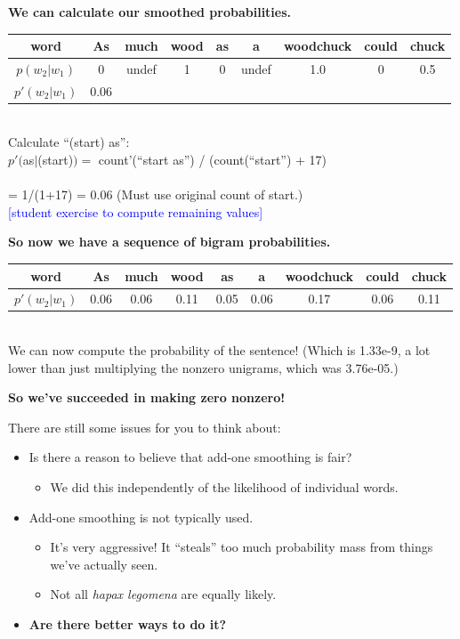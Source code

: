 \documentclass{beamer}
\newcommand{\placard}[1]{
  \begin{frame}
    \begin{center}
      \huge
      \textbf{#1}
    \end{center}
  \end{frame}
}
\newcommand{\pagestepalt}[2]{
  \begin{frame}[t]
    \begin{minipage}[t][0.26\textheight][t]{\textwidth}
      \begin{center}
        \huge
        \textbf{#1}
      \end{center}
    \end{minipage}
    
    \begin{minipage}[t][0.7\textheight][t]{\textwidth}
      #2
    \end{minipage}
  \end{frame}
}
\begin{document}
\pagestepalt{We can calculate our smoothed probabilities.}{
  \begin{tabular}{c|cccccccc}
    word & As & much & wood & as & a & woodchuck & could & chuck\\
    \hline
    $p(w_2|w_1)$ &\alert{0}&\alert{undef}&\alert{1} & \alert{0} & \alert{undef} & \alert{1.0} & \alert{0} & 0.5\\
    \alert{$p'(w_2|w_1)$} & \alert{0.06} \\
  \end{tabular}  \\

  \vspace{0.1cm}
  Calculate ``(start) as'': 
  \\$p'($as$|$(start)$) =$ count'(``start as'') / (count(``start'') + 17)\\
  \\= 1/(1+17) = 0.06
  (Must use original count of start.)\\
  \textcolor{blue}{[student exercise to compute remaining values]}
}


\pagestepalt{So now we have a sequence of bigram probabilities.}{
  \begin{tabular}{c|cccccccc}
    word & As & much & wood & as & a & woodchuck & could & chuck\\
    \hline
    \alert{$p'(w_2|w_1)$} & \alert{0.06} & \alert{0.06} & \alert{0.11} & \alert{0.05} & \alert{0.06} & \alert{0.17} & \alert{0.06} & \alert{0.11}\\
  \end{tabular}  \\

  We can now compute the probability of the sentence!\pause 
  (Which is
  1.33e-9, a lot lower than just multiplying the nonzero unigrams,
  which was 3.76e-05.)  
}




\pagestepalt{So we've succeeded in making zero nonzero!}{
  There are still some issues for you to think about: \pause
  \begin{itemize}
  \item Is there a reason to believe that add-one smoothing is fair? 
    \begin{itemize}
    \item We did this independently of the likelihood of individual words.
    \end{itemize}
  \item  Add-one smoothing is not typically used.\pause
    \begin{itemize}
    \item It's very aggressive! It ``steals'' too much probability mass from 
      things we've actually seen.\pause
    \item Not all {\it hapax legomena} are equally likely.\pause
  \end{itemize}
  \item \textbf{Are there better ways to do it?}
  \end{itemize}
}
\end{document}
